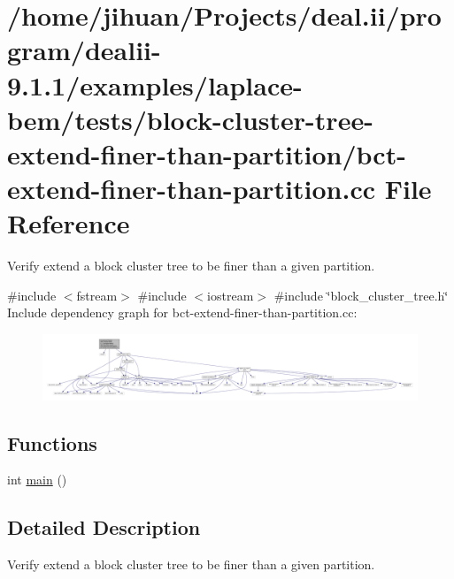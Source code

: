 \hypertarget{bct-extend-finer-than-partition_8cc}{}\section{/home/jihuan/\+Projects/deal.ii/program/dealii-\/9.1.1/examples/laplace-\/bem/tests/block-\/cluster-\/tree-\/extend-\/finer-\/than-\/partition/bct-\/extend-\/finer-\/than-\/partition.cc File Reference}
\label{bct-extend-finer-than-partition_8cc}


Verify extend a block cluster tree to be finer than a given partition.  


{\ttfamily \#include $<$fstream$>$}\newline
{\ttfamily \#include $<$iostream$>$}\newline
{\ttfamily \#include \char`\"{}block\+\_\+cluster\+\_\+tree.\+h\char`\"{}}\newline
Include dependency graph for bct-\/extend-\/finer-\/than-\/partition.cc\+:
\nopagebreak
\begin{figure}[H]
\begin{center}
\leavevmode
\includegraphics[width=350pt]{bct-extend-finer-than-partition_8cc__incl}
\end{center}
\end{figure}
\subsection*{Functions}
\begin{DoxyCompactItemize}
\item 
int \hyperlink{bct-extend-finer-than-partition_8cc_ae66f6b31b5ad750f1fe042a706a4e3d4}{main} ()
\end{DoxyCompactItemize}


\subsection{Detailed Description}
Verify extend a block cluster tree to be finer than a given partition. 

